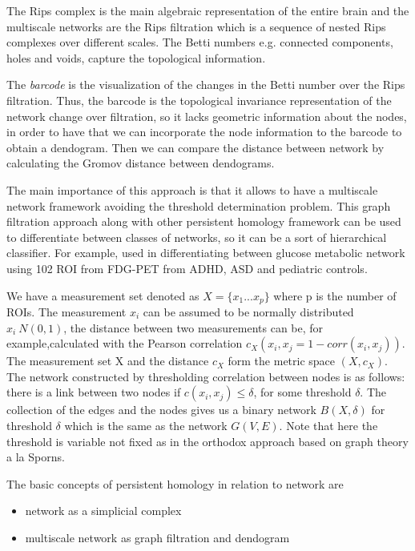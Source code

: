 \documentclass[onecollarge,runningheads]{svjour2}
\begin{document}
The Rips complex is the main algebraic representation of the entire brain and the multiscale networks are the Rips filtration which is a sequence of nested Rips complexes over different scales. The Betti numbers e.g. connected components, holes and voids, capture the topological information. 

The \textit{barcode} is the visualization of the changes in the Betti number over the Rips filtration. Thus, the barcode is the topological invariance representation of the network change over filtration, so it lacks geometric information about the nodes, in order to have that we can incorporate the node information to the barcode to obtain a dendogram. Then we can compare the distance between network by calculating the Gromov distance between dendograms.

The main importance of this approach is that it allows to have a multiscale network framework avoiding the threshold determination problem.
This graph filtration approach along with other persistent homology framework can be used to differentiate between classes of networks, so it can be a sort of hierarchical classifier. For example, used in differentiating between glucose metabolic network using 102 ROI from FDG-PET from ADHD, ASD and pediatric controls.

We have a measurement set denoted as $X= \{ x_1 ... x_p\}$ where p is the number of ROIs. The measurement $x_i$ can be assumed to be normally distributed $x_i ~ N(0,1)$, the distance between two measurements can be, for example,calculated with the Pearson correlation $c_{X}(x_i,x_j= 1 - corr(x_i,x_j))$. 
The measurement set X and the distance $c_X$ form the metric space $(X,c_X)$. The network constructed by thresholding correlation between nodes is as follows:
there is a link between two nodes if $c(x_i,x_j) \leq \delta$, for some threshold $\delta$. The collection of the edges and the nodes gives us a binary network $B(X,\delta)$ for threshold $\delta$ which is the same as the network $G(V,E)$. Note that here the threshold is variable not fixed as in the orthodox approach based on graph theory a la Sporns.

The basic concepts of persistent homology in relation to network are
\begin{itemize}
\item network as a simplicial complex
\item multiscale network as graph filtration and dendogram 
\end{itemize}
\end{document}
